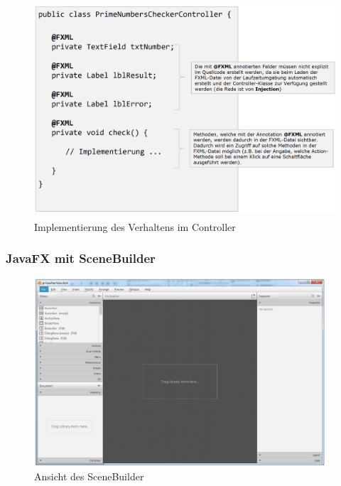 \documentclass[a4paper]{article}
\begin{document}
		\begin{figure}[!htb]
			\centering
			\includegraphics[keepaspectratio, height=8cm]{img/gui/verhalten.png}
			\caption{Implementierung des Verhaltens im Controller}
			\label{fig:verhalten}
		\end{figure}
		
		\subsubsection{JavaFX mit SceneBuilder}
		
		\begin{figure}[!htb]
			\centering
			\includegraphics[keepaspectratio, height=7cm]{img/gui/scenebuilder.png}
			\caption{Ansicht des SceneBuilder}
			\label{fig:scene01}
		\end{figure}
	
		\newpage
	
\end{document}
